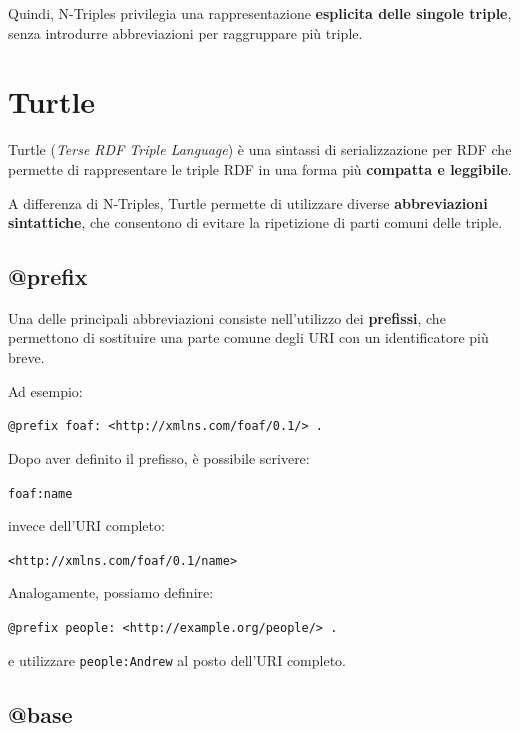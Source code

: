 Quindi, N-Triples privilegia una rappresentazione \textbf{esplicita delle singole triple}, senza introdurre abbreviazioni per raggruppare più triple.

\section{Turtle}

Turtle (\textit{Terse RDF Triple Language}) è una sintassi di serializzazione per RDF che permette di rappresentare le triple RDF in una forma più \textbf{compatta e leggibile}.

A differenza di N-Triples, Turtle permette di utilizzare diverse \textbf{abbreviazioni sintattiche}, che consentono di evitare la ripetizione di parti comuni delle triple.

\subsection*{@prefix}

Una delle principali abbreviazioni consiste nell'utilizzo dei \textbf{prefissi}, che permettono di sostituire una parte comune degli URI con un identificatore più breve.

Ad esempio:

\begin{center}
\texttt{@prefix foaf: <http://xmlns.com/foaf/0.1/> .}
\end{center}

Dopo aver definito il prefisso, è possibile scrivere:

\begin{center}
\texttt{foaf:name}
\end{center}

invece dell'URI completo:

\begin{center}
\texttt{<http://xmlns.com/foaf/0.1/name>}
\end{center}

Analogamente, possiamo definire:

\begin{center}
\texttt{@prefix people: <http://example.org/people/> .}
\end{center}

e utilizzare \texttt{people:Andrew} al posto dell'URI completo.

\subsection*{@base}

